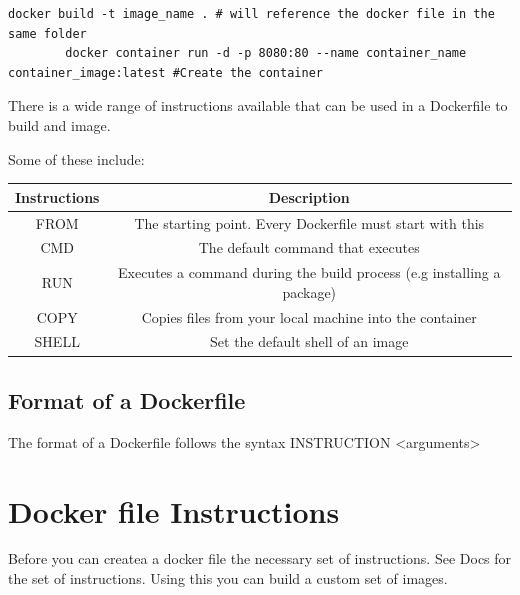 \documentclass[11pt]{book}
\begin{document}
    \begin{lstlisting}[style=terminal]
        docker build -t image_name . # will reference the docker file in the same folder
        docker container run -d -p 8080:80 --name container_name container_image:latest #Create the container
    \end{lstlisting}

    There is a wide range of instructions available that can be used in a Dockerfile to build and image.

    Some of these include:

    \begin{table}[ht]
        \centering
        \begin{tabular}{|c|c|}
            \hline
            Instructions & Description                                                            \\ \hline
            FROM         & The starting point. Every Dockerfile must start with this              \\ \hline
            CMD          & The default command that executes                                      \\ \hline
            RUN          & Executes a command during the build process (e.g installing a package) \\ \hline
            COPY         & Copies files from your local machine into the container                \\ \hline
            SHELL        & Set the default shell of an image                                      \\ \hline
        \end{tabular}
    \end{table}

    \subsection{Format of a Dockerfile}
    The format of a Dockerfile follows the syntax INSTRUCTION <arguments>


    \section{Docker file Instructions}
    Before you can createa a docker file the necessary set of instructions.
    See Docs for the set of instructions. Using this you can build a custom set of images.
\end{document}
